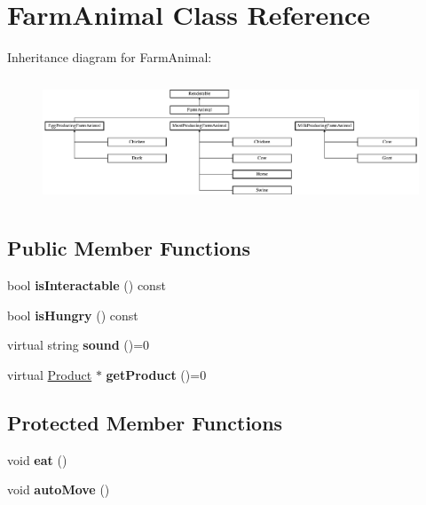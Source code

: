\hypertarget{class_farm_animal}{}\section{Farm\+Animal Class Reference}
\label{class_farm_animal}
Inheritance diagram for Farm\+Animal\+:\begin{figure}[H]
\begin{center}
\leavevmode
\includegraphics[height=3.776493cm]{class_farm_animal}
\end{center}
\end{figure}
\subsection*{Public Member Functions}
\begin{DoxyCompactItemize}
\item 
\mbox{\label{class_farm_animal_ab3bbdd721661612905812389b2379b88}} 
bool {\bfseries is\+Interactable} () const
\item 
\mbox{\label{class_farm_animal_a60e61a526c4586c4a2597ef6369b98a4}} 
bool {\bfseries is\+Hungry} () const
\item 
\mbox{\label{class_farm_animal_a2d79c6ed1b700dfcb052a97310edab8c}} 
virtual string {\bfseries sound} ()=0
\item 
\mbox{\label{class_farm_animal_a9adaa8eb0b9347cf5b757f0cd2df3748}} 
virtual \mbox{\hyperlink{class_product}{Product}} $\ast$ {\bfseries get\+Product} ()=0
\end{DoxyCompactItemize}
\subsection*{Protected Member Functions}
\begin{DoxyCompactItemize}
\item 
\mbox{\label{class_farm_animal_ad805436da6500547986a78f986f85904}} 
void {\bfseries eat} ()
\item 
\mbox{\label{class_farm_animal_a0c74f03b3e3bad594cafad6c9403aa8f}} 
void {\bfseries auto\+Move} ()
\end{DoxyCompactItemize}
